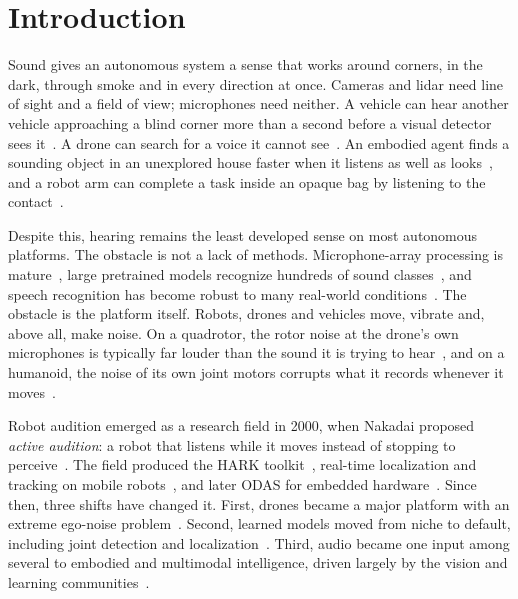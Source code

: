 \section{Introduction}
\label{sec:intro}

Sound gives an autonomous system a sense that works around corners, in the dark, through smoke and in every direction at once.
Cameras and lidar need line of sight and a field of view; microphones need neither.
A vehicle can hear another vehicle approaching a blind corner more than a second before a visual detector sees it~\cite{schulz2021hearing}.
A drone can search for a voice it cannot see~\cite{deleforge2019spcup,hoshiba2017uav}.
An embodied agent finds a sounding object in an unexplored house faster when it listens as well as looks~\cite{chen2020soundspaces,gan2020look}, and a robot arm can complete a task inside an opaque bag by listening to the contact~\cite{du2022playitbyear}.

Despite this, hearing remains the least developed sense on most autonomous platforms.
The obstacle is not a lack of methods.
Microphone-array processing is mature~\cite{knapp1976gcc,schmidt1986music,capon1969mvdr}, large pretrained models recognize hundreds of sound classes~\cite{gemmeke2017audioset,kong2020panns,gong2021ast,chen2023beats}, and speech recognition has become robust to many real-world conditions~\cite{radford2023whisper}.
The obstacle is the platform itself.
Robots, drones and vehicles move, vibrate and, above all, make noise.
On a quadrotor, the rotor noise at the drone's own microphones is typically far louder than the sound it is trying to hear~\cite{strauss2018dregon,ruizespitia2018aira}, and on a humanoid, the noise of its own joint motors corrupts what it records whenever it moves~\cite{ince2009template}.

Robot audition emerged as a research field in 2000, when Nakadai \etal proposed \emph{active audition}: a robot that listens while it moves instead of stopping to perceive~\cite{nakadai2000active}.
The field produced the HARK toolkit~\cite{nakadai2017hark}, real-time localization and tracking on mobile robots~\cite{valin2003robust,valin2007tracking}, and later ODAS for embedded hardware~\cite{grondin2022odas}.
Since then, three shifts have changed it.
First, drones became a major platform with an extreme ego-noise problem~\cite{strauss2018dregon,manamperi2022drone,yen2023ncm,chevtchenko2025review}.
Second, learned models moved from niche to default, including joint detection and localization~\cite{adavanne2019seld,shimada2021accdoa,politis2021dcase}.
Third, audio became one input among several to embodied and multimodal intelligence, driven largely by the vision and learning communities~\cite{chen2020soundspaces,gao2020visualechoes,li2022seehearfeel,majumder2021move2hear}.

